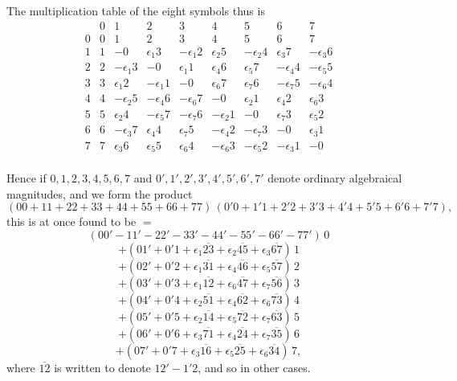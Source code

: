 \documentclass[11pt,a4paper]{article}
\begin{document}
The multiplication table of the eight symbols thus is
\[
  \begin{array}{c|cccccccc}
       & 0 & 1 & 2 & 3 & 4 & 5 & 6 & 7 \\
    \hline
    0  & 0 & 1 & 2 & 3 & 4 & 5 & 6 & 7 \\
    1  & 1 & -0 & \epsilon_{1}3 & -\epsilon_{1}2 & \epsilon_{2}5 & -\epsilon_{2}4 & \epsilon_{3}7 & -\epsilon_{3}6 \\
    2  & 2 & -\epsilon_{1}3 & -0 & \epsilon_{1}1 & \epsilon_{4}6 & \epsilon_{5}7 & -\epsilon_{4}4 & -\epsilon_{5}5 \\
    3  & 3 & \epsilon_{1}2 & -\epsilon_{1}1 & -0 & \epsilon_{6}7 & \epsilon_{7}6 & -\epsilon_{7}5 & -\epsilon_{6}4 \\
    4  & 4 & -\epsilon_{2}5 & -\epsilon_{4}6 & -\epsilon_{6}7 & -0 & \epsilon_{2}1 & \epsilon_{4}2 & \epsilon_{6}3 \\
    5  & 5 & \epsilon_{2}4 & -\epsilon_{5}7 & -\epsilon_{7}6 & -\epsilon_{2}1 & -0 & \epsilon_{7}3 & \epsilon_{5}2 \\
    6  & 6 & -\epsilon_{3}7 & \epsilon_{4}4 & \epsilon_{7}5 & -\epsilon_{4}2 & -\epsilon_{7}3 & -0 & \epsilon_{3}1 \\
    7  & 7 & \epsilon_{3}6 & \epsilon_{5}5 & \epsilon_{6}4 & -\epsilon_{6}3 & -\epsilon_{5}2 & -\epsilon_{3}1 & -0 \\
  \end{array}
\]

\newpage
\noindent
Hence if $0,1,2,3,4,5,6,7$ and $0',1',2',3',4',5',6',7'$ denote ordinary
algebraical magnitudes, and we form the product
\[
  (00+11+22+33+44+55+66+77)\,(0'0+1'1+2'2+3'3+4'4+5'5+6'6+7'7),
\]
this is at once found to be $=$
\[
  (00'-11'-22'-33'-44'-55'-66'-77')\,0
\]
\[
  +(01'+0'1+\epsilon_{1}\overline{23}+\epsilon_{2}\overline{45}+\epsilon_{3}\overline{67})\,1
\]
\[
  +(02'+0'2+\epsilon_{1}\overline{31}+\epsilon_{4}\overline{46}+\epsilon_{5}\overline{57})\,2
\]
\[
  +(03'+0'3+\epsilon_{1}\overline{12}+\epsilon_{6}\overline{47}+\epsilon_{7}\overline{56})\,3
\]
\[
  +(04'+0'4+\epsilon_{2}\overline{51}+\epsilon_{4}\overline{62}+\epsilon_{6}\overline{73})\,4
\]
\[
  +(05'+0'5+\epsilon_{2}\overline{14}+\epsilon_{5}\overline{72}+\epsilon_{7}\overline{63})\,5
\]
\[
  +(06'+0'6+\epsilon_{3}\overline{71}+\epsilon_{4}\overline{24}+\epsilon_{7}\overline{35})\,6
\]
\[
  +(07'+0'7+\epsilon_{3}\overline{16}+\epsilon_{5}\overline{25}+\epsilon_{6}\overline{34})\,7,
\]
where $\overline{12}$ is written to denote $12'-1'2$, and so in other cases.
\end{document}
